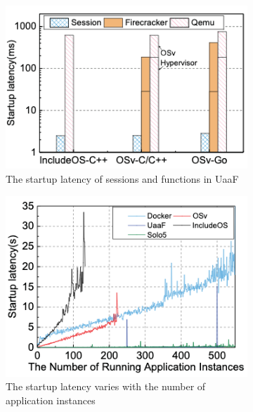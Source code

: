 \begin{figure}[!b]
\centering %

\begin{subfigure}{0.34\textwidth}
  \includegraphics[width=\linewidth]{images/uaaf_start_lat.png}
  \caption{The startup latency of sessions and functions in UaaF}
  \label{fig:uaaf_start_lat}
\end{subfigure} \hfil%
\begin{subfigure}{0.31\textwidth}
  \includegraphics[width=\linewidth]{images/uaaf_start_lat_multiple.png}
  \caption{The startup latency varies with the number of application instances}
  \label{fig:uaaf_startvsmulti}
\end{subfigure} \hfil%
\begin{subfigure}{0.33\textwidth}

\end{subfigure}
\end{figure}
